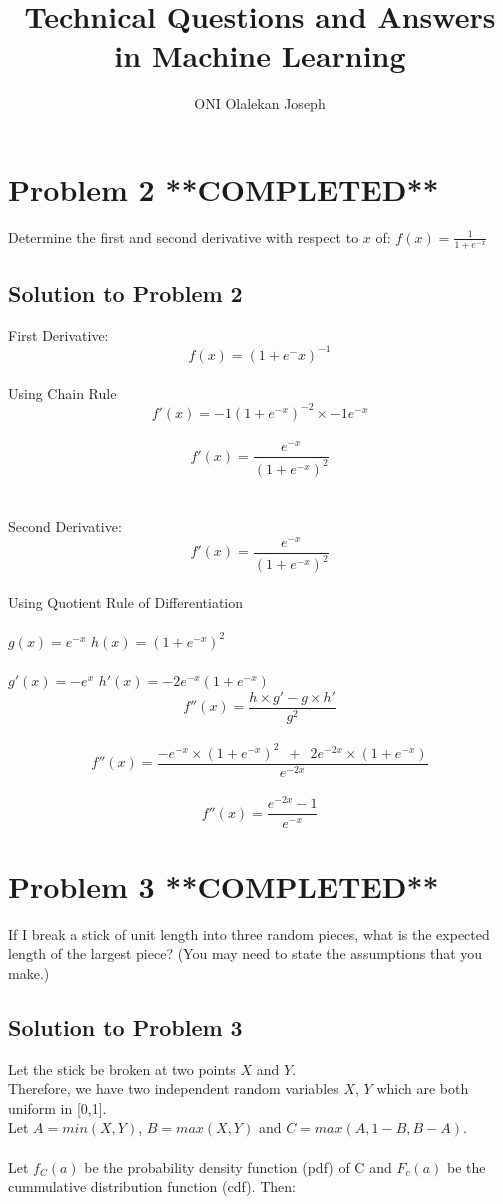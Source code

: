 \documentclass{article}
\begin{document}
\title{Technical Questions and Answers in Machine Learning}
\author{ONI Olalekan Joseph}

\maketitle

\section{Problem 2 **COMPLETED**}
Determine the first and second derivative with respect to $x$ of: $f(x)= \frac{1}{1 + e^{-x}} $

\subsection{Solution to Problem 2 }
 First Derivative: \\
 $$f(x) = (1 + e^-x)^{-1}$$ \\
 Using Chain Rule \\
 $$f'(x) = -1(1 + e^{-x})^{-2} \times -1e^{-x}$$ \\
 $$f'(x) = \frac{e^{-x}}{(1 + e^{-x})^{2}}$$ \\ \\
 
\noindent Second Derivative:  \\
 $$f'(x) = \frac{e^{-x}}{(1 + e^{-x})^{2}}$$ \\
 Using Quotient Rule of Differentiation \\ \\
 $g(x) = e^{-x}$  \qquad  $h(x) = (1 + e^{-x})^{2} $ \\\\
 $ g'(x) = -e^{x} $ \qquad $h'(x) = -2e^{-x}(1 + e^{-x}) $ \\
 $$f''(x) = \frac{h \times g' - g \times h' }{g^2} $$ \\
 $$f''(x) = \frac{-e^{-x} \times (1 + e^{-x})^{2} \enspace + \enspace 2e^{-2x} \times (1 + e^{-x})}{e^{-2x}} $$\\
 $$f''(x) = \frac{e^{-2x} - 1}{e^{-x}} $$
 
\section{Problem 3 **COMPLETED**}
 If I break a stick of unit length into three random pieces, what is the expected length of the largest piece? (You may need to state the assumptions that you make.)
 
\subsection{Solution to Problem 3}
Let the stick be broken at two points $X$ and $Y$. \\
Therefore, we have two independent random variables $X$, $Y$ which are both uniform in [0,1]. \\
Let $A=min(X,Y)$, $B=max(X,Y)$ and $C=max(A,1-B,B-A)$. \\ \\
Let $f_{C}(a)$ be the probability density function (pdf) of C and $ F_{c}(a)$ be the cummulative distribution function (cdf). Then: 
\end{document}
